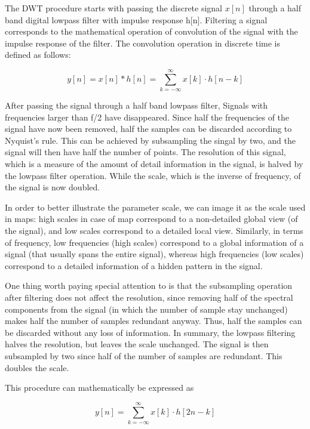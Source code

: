The DWT procedure starts with passing the discrete signal $x[n]$ through a half band digital lowpass filter with impulse response h[n]. Filtering a signal corresponds to the mathematical operation of convolution of the signal with the impulse response of the filter. The convolution operation in discrete time is defined as follows:

\begin{equation}
y[n]=x[n] * h[n]=\sum_{k=-\infty}^{\infty} x[k] \cdot h[n-k]
\label{equ:convolude}
\end{equation}

After passing the signal through a half band lowpass filter, Signals with frequencies larger than f/2 have disappeared. Since half the frequencies of the signal have now been removed, half the samples can be discarded according to Nyquist’s rule. This can be achieved by subsampling the singal by two, and the signal will then have half the number of points. The resolution of this signal, which is a measure of the amount of detail information in the signal, is halved by the lowpass filter operation. While the scale, which is the inverse of frequency, of the signal is now doubled. 

In order to better illustrate the parameter scale, we can image it as the scale used in maps: high scales in case of map correspond to a non-detailed global view (of the signal), and low scales correspond to a detailed local view. Similarly, in terms of frequency, low frequencies (high scales) correspond to a global information of a signal (that usually spans the entire signal), whereas high frequencies (low scales) correspond to a detailed information of a hidden pattern in the signal. 

One thing worth paying special attention to is that the subsampling operation after filtering does not affect the resolution, since removing half of the spectral components from the signal (in which the number of sample stay unchanged) makes half the number of samples redundant anyway. Thus, half the samples can be discarded without any loss of information. In summary, the lowpass filtering halves the resolution, but leaves the scale unchanged. The signal is then subsampled by two since half of the number of samples are redundant. This doubles the scale.

This procedure can mathematically be expressed as

\begin{equation}
y[n]=\sum_{k=-\infty}^{\infty} x[k] \cdot h[2 n-k]
\label{equ:subband}
\end{equation}

